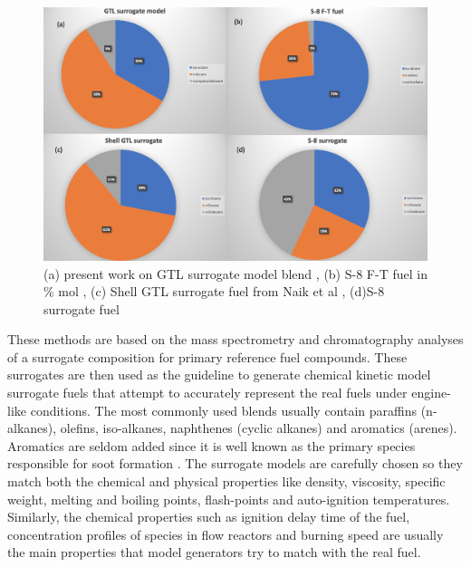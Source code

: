 \begin{figure}[ht]
    \centering
    \includegraphics[width=\textwidth, height=\textheight, keepaspectratio]{images/GTL-composition.png}
    \caption{ (a) present work on GTL surrogate model blend \cite{Dagaut2014}, (b) S-8 F-T fuel in \% mol \cite{Naik2011DetailedFuels}, (c) Shell GTL surrogate fuel from Naik et al \cite{Naik2011DetailedFuels}, (d)S-8 surrogate fuel \cite{Moses2008COMPARATIVEREPORT}}
    \label{fig:GTL-composition}
\end{figure}


These methods are based on the mass spectrometry and chromatography analyses of a surrogate composition for primary reference fuel compounds. These surrogates are then used as the guideline to generate chemical kinetic model surrogate fuels that attempt to accurately represent the real fuels under engine-like conditions. The most commonly used blends usually contain paraffins (n-alkanes), olefins, iso-alkanes, naphthenes (cyclic alkanes) and aromatics (arenes). Aromatics are seldom added since it is well known as the primary species responsible for soot formation \cite{RoleOSTI.GOV}. The surrogate models are carefully chosen so they match both the chemical and physical properties like density, viscosity, specific weight, melting and boiling points, flash-points and auto-ignition temperatures. Similarly, the chemical properties such as ignition delay time of the fuel, concentration profiles of species in flow reactors and burning speed are usually the main properties that model generators try to match with the real fuel.

